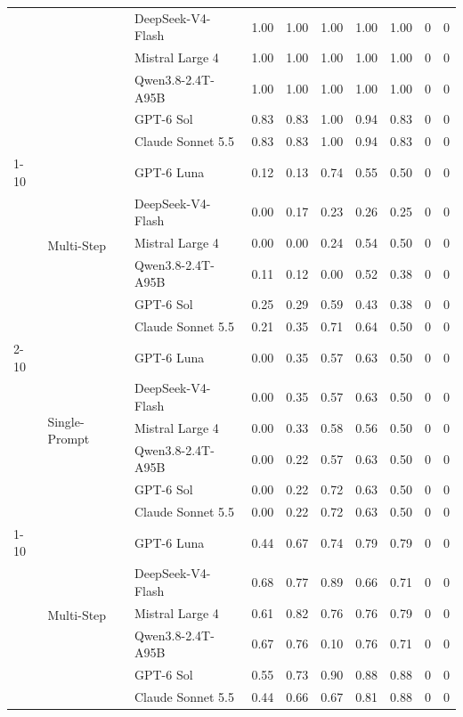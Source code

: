 \begin{tabular}{lllrrrrrrr}
 &  & DeepSeek-V4-Flash & 1.00 & 1.00 & 1.00 & 1.00 & 1.00 & 0 & 0 \\
 &  & Mistral Large 4 & 1.00 & 1.00 & 1.00 & 1.00 & 1.00 & 0 & 0 \\
 &  & Qwen3.8-2.4T-A95B & 1.00 & 1.00 & 1.00 & 1.00 & 1.00 & 0 & 0 \\
 &  & GPT-6 Sol & 0.83 & 0.83 & 1.00 & 0.94 & 0.83 & 0 & 0 \\
 &  & Claude Sonnet 5.5 & 0.83 & 0.83 & 1.00 & 0.94 & 0.83 & 0 & 0 \\
\cline{1-10} \cline{2-10}
\multirow[t]{12}{*}{hmdaz} & \multirow[t]{6}{*}{Multi-Step} & GPT-6 Luna & 0.12 & 0.13 & 0.74 & 0.55 & 0.50 & 0 & 0 \\
 &  & DeepSeek-V4-Flash & 0.00 & 0.17 & 0.23 & 0.26 & 0.25 & 0 & 0 \\
 &  & Mistral Large 4 & 0.00 & 0.00 & 0.24 & 0.54 & 0.50 & 0 & 0 \\
 &  & Qwen3.8-2.4T-A95B & 0.11 & 0.12 & 0.00 & 0.52 & 0.38 & 0 & 0 \\
 &  & GPT-6 Sol & 0.25 & 0.29 & 0.59 & 0.43 & 0.38 & 0 & 0 \\
 &  & Claude Sonnet 5.5 & 0.21 & 0.35 & 0.71 & 0.64 & 0.50 & 0 & 0 \\
\cline{2-10}
 & \multirow[t]{6}{*}{Single-Prompt} & GPT-6 Luna & 0.00 & 0.35 & 0.57 & 0.63 & 0.50 & 0 & 0 \\
 &  & DeepSeek-V4-Flash & 0.00 & 0.35 & 0.57 & 0.63 & 0.50 & 0 & 0 \\
 &  & Mistral Large 4 & 0.00 & 0.33 & 0.58 & 0.56 & 0.50 & 0 & 0 \\
 &  & Qwen3.8-2.4T-A95B & 0.00 & 0.22 & 0.57 & 0.63 & 0.50 & 0 & 0 \\
 &  & GPT-6 Sol & 0.00 & 0.22 & 0.72 & 0.63 & 0.50 & 0 & 0 \\
 &  & Claude Sonnet 5.5 & 0.00 & 0.22 & 0.72 & 0.63 & 0.50 & 0 & 0 \\
\cline{1-10} \cline{2-10}
\multirow[t]{12}{*}{hmda_checks} & \multirow[t]{6}{*}{Multi-Step} & GPT-6 Luna & 0.44 & 0.67 & 0.74 & 0.79 & 0.79 & 0 & 0 \\
 &  & DeepSeek-V4-Flash & 0.68 & 0.77 & 0.89 & 0.66 & 0.71 & 0 & 0 \\
 &  & Mistral Large 4 & 0.61 & 0.82 & 0.76 & 0.76 & 0.79 & 0 & 0 \\
 &  & Qwen3.8-2.4T-A95B & 0.67 & 0.76 & 0.10 & 0.76 & 0.71 & 0 & 0 \\
 &  & GPT-6 Sol & 0.55 & 0.73 & 0.90 & 0.88 & 0.88 & 0 & 0 \\
 &  & Claude Sonnet 5.5 & 0.44 & 0.66 & 0.67 & 0.81 & 0.88 & 0 & 0 \\

\end{tabular}
